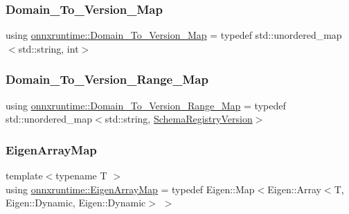 \subsubsection{\texorpdfstring{Domain\+\_\+\+To\+\_\+\+Version\+\_\+\+Map}{Domain\_To\_Version\_Map}}
{\footnotesize\ttfamily using \mbox{\hyperlink{namespaceonnxruntime_ab773a024322804641f5eb4964e3471d6}{onnxruntime\+::\+Domain\+\_\+\+To\+\_\+\+Version\+\_\+\+Map}} = typedef std\+::unordered\+\_\+map$<$std\+::string, int$>$}

\mbox{\label{namespaceonnxruntime_a42522f79cdc7cf087dcf008b2cbcc66e}} 
\subsubsection{\texorpdfstring{Domain\+\_\+\+To\+\_\+\+Version\+\_\+\+Range\+\_\+\+Map}{Domain\_To\_Version\_Range\_Map}}
{\footnotesize\ttfamily using \mbox{\hyperlink{namespaceonnxruntime_a42522f79cdc7cf087dcf008b2cbcc66e}{onnxruntime\+::\+Domain\+\_\+\+To\+\_\+\+Version\+\_\+\+Range\+\_\+\+Map}} = typedef std\+::unordered\+\_\+map$<$std\+::string, \mbox{\hyperlink{structonnxruntime_1_1SchemaRegistryVersion}{Schema\+Registry\+Version}}$>$}

\mbox{\label{namespaceonnxruntime_acdad0b507bc192674e1987304d62d9c5}} 
\subsubsection{\texorpdfstring{Eigen\+Array\+Map}{EigenArrayMap}}
{\footnotesize\ttfamily template$<$typename T $>$ \\
using \mbox{\hyperlink{namespaceonnxruntime_acdad0b507bc192674e1987304d62d9c5}{onnxruntime\+::\+Eigen\+Array\+Map}} = typedef Eigen\+::\+Map$<$Eigen\+::\+Array$<$T, Eigen\+::\+Dynamic, Eigen\+::\+Dynamic$>$ $>$}

\mbox{\label{namespaceonnxruntime_a0d10378b0bb27204277ff1ec0661cc11}} 
